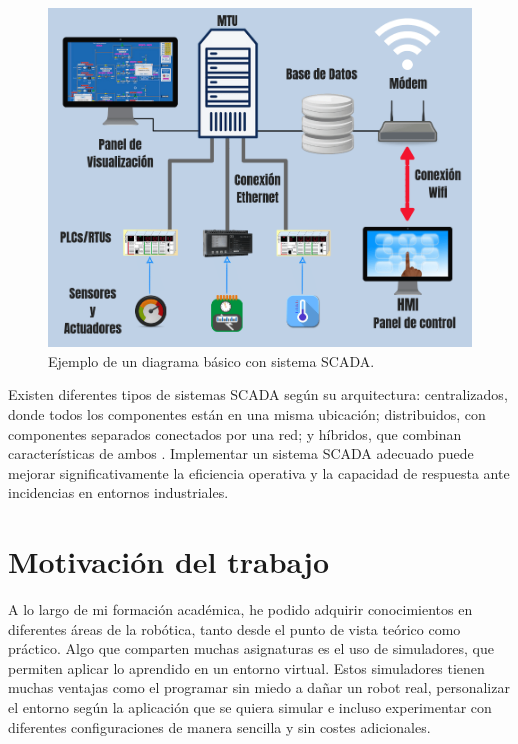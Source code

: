 \begin{figure} [h!]
  \begin{center}
    \includegraphics[width=15cm]{figs/SCADA}
  \end{center}
  \caption{\centering Ejemplo de un diagrama básico con sistema SCADA. \cite{scada_img}}
  \label{fig:SCADA}
\end{figure} 

Existen diferentes tipos de sistemas SCADA según su arquitectura: centralizados, donde todos los componentes están en una misma ubicación; distribuidos, con componentes separados conectados por una red; y híbridos, que combinan características de ambos \cite{scada}. Implementar un sistema SCADA adecuado puede mejorar significativamente la eficiencia operativa y la capacidad de respuesta ante incidencias en entornos industriales.

\section{Motivación del trabajo}
\label{sec:cuartaseccion}

A lo largo de mi formación académica, he podido adquirir conocimientos en diferentes áreas de la robótica, tanto desde el punto de vista teórico como práctico. Algo que comparten muchas asignaturas es el uso de simuladores, que permiten aplicar lo aprendido en un entorno virtual. Estos simuladores tienen muchas ventajas como el programar sin miedo a dañar un robot real, personalizar el entorno según la aplicación que se quiera simular e incluso experimentar con diferentes configuraciones de manera sencilla y sin costes adicionales.

